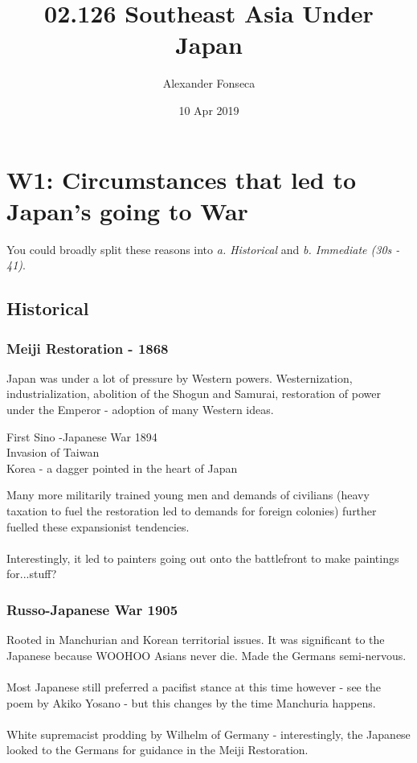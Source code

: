\documentclass[a4paper]{article}
\title{02.126 Southeast Asia Under Japan}
\author{Alexander Fonseca}
\date{10 Apr 2019}
\begin{document}
\maketitle
\tableofcontents
\newpage
\section{W1: Circumstances that led to Japan's going to War}
You could broadly split these reasons into \textit{a. Historical} and \textit{b. Immediate (30s - 41)}. 
\subsection{Historical}
\subsubsection{Meiji Restoration - 1868}
Japan was under a lot of pressure by Western powers. Westernization, industrialization, abolition of the Shogun and Samurai, restoration of power under the Emperor - adoption of many Western ideas.
\begin{framed}
	\begin{displayquote}
		First Sino -Japanese War 1894\\
		Invasion of Taiwan\\
		Korea - a dagger pointed in the heart of Japan
	\end{displayquote}
\end{framed}
\noindent Many more militarily trained young men and demands of civilians (heavy taxation to fuel the restoration led to demands for foreign colonies) further fuelled these expansionist tendencies.\\
\\
Interestingly, it led to painters going out onto the battlefront to make paintings for...stuff?
\subsubsection{Russo-Japanese War 1905}
Rooted in Manchurian and Korean territorial issues. It was significant to the Japanese because WOOHOO Asians never die. Made the Germans semi-nervous.\\
\\
Most Japanese still preferred a pacifist stance at this time however - see the poem by Akiko Yosano - but this changes by the time Manchuria happens.\\
\\
White supremacist prodding by Wilhelm of Germany - interestingly, the Japanese looked to the Germans for guidance in the Meiji Restoration.
\end{document}
